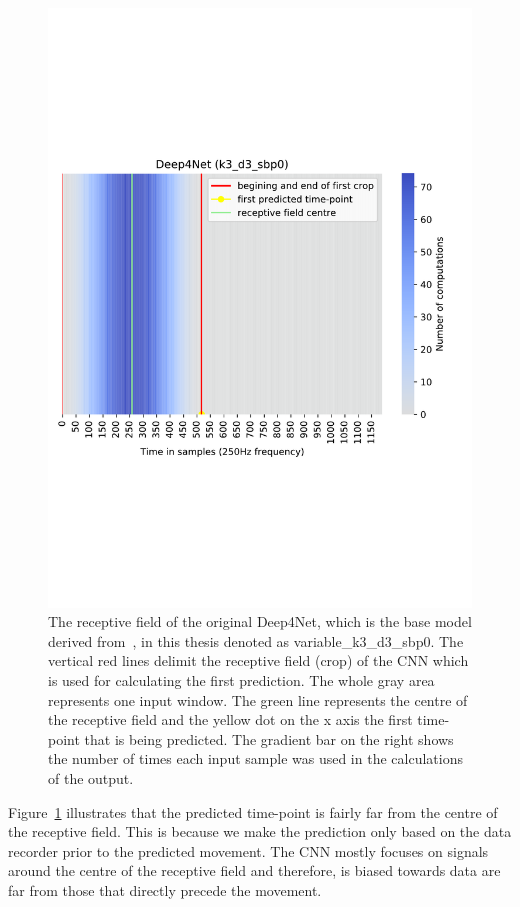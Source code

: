 \begin{figure}[!htbp]
\centering
\includegraphics[width=0.8\linewidth]{img/ch3/deep4net-receptive-field}
\caption[Receptive field]{The receptive field of the original Deep4Net, which is the base model derived from~\cite{Hammer-2021}, in this thesis denoted as {variable}\_k3\_d3\_sbp0.
The vertical red lines delimit the receptive field (crop) of the CNN which is used for calculating the first prediction.
The whole gray area represents one input window.
The green line represents the centre of the receptive field and the yellow dot on the x axis the first time-point that is being predicted.
The gradient bar on the right shows the number of times each input sample was used in the calculations of the output.}
\label{fig:receptive-field}
\end{figure}

Figure~\ref{fig:receptive-field} illustrates that the predicted time-point is fairly far from the centre of the receptive field.
This is because we make the prediction only based on the data recorder prior to the predicted movement.
The CNN mostly focuses on signals around the centre of the receptive field and therefore, is biased towards data are far from those that directly precede the movement.

